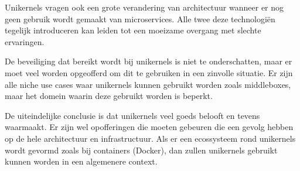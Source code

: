 \documentclass[pdftex,a4paper,12pt,twoside]{report}
\begin{document}
Unikernels vragen ook een grote verandering van architectuur wanneer er nog geen gebruik wordt gemaakt van microservices. Alle twee deze technologiën tegelijk introduceren kan leiden tot een moeizame overgang met slechte ervaringen.

De beveiliging dat bereikt wordt bij unikernels is niet te onderschatten, maar er moet veel worden opgeofferd om dit te gebruiken in een zinvolle situatie. Er zijn alle niche use cases waar unikernels kunnen gebruikt worden zoals middleboxes, maar het domein waarin deze gebruikt worden is beperkt.

De uiteindelijke conclusie is dat unikernels veel goeds belooft en tevens waarmaakt. Er zijn wel opofferingen die moeten gebeuren die een gevolg hebben op de hele architectuur en infrastructuur. Als er een ecossysteem rond unikernels wordt gevormd zoals bij containers (Docker), dan zullen unikernels gebruikt kunnen worden in een algemenere context.





\listoffigures
\listoftables
\end{document}

